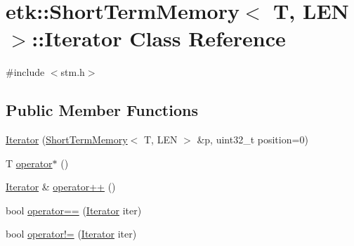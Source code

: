 \hypertarget{classetk_1_1_short_term_memory_1_1_iterator}{\section{etk\-:\-:Short\-Term\-Memory$<$ T, L\-E\-N $>$\-:\-:Iterator Class Reference}
\label{classetk_1_1_short_term_memory_1_1_iterator}
}


{\ttfamily \#include $<$stm.\-h$>$}

\subsection*{Public Member Functions}
\begin{DoxyCompactItemize}
\item 
\hyperlink{classetk_1_1_short_term_memory_1_1_iterator_a9b5864137b9f2d23d1b79fe6254049d0}{Iterator} (\hyperlink{classetk_1_1_short_term_memory}{Short\-Term\-Memory}$<$ T, L\-E\-N $>$ \&p, uint32\-\_\-t position=0)
\item 
T \hyperlink{classetk_1_1_short_term_memory_1_1_iterator_ae0dad866d5927d8ee3d9717a178427e8}{operator$\ast$} ()
\item 
\hyperlink{classetk_1_1_short_term_memory_1_1_iterator}{Iterator} \& \hyperlink{classetk_1_1_short_term_memory_1_1_iterator_ae5d8621f94f142690d5d2bd50aa3d8af}{operator++} ()
\item 
bool \hyperlink{classetk_1_1_short_term_memory_1_1_iterator_a18c7ce8f9a1b98ffec26f6be66fa54b0}{operator==} (\hyperlink{classetk_1_1_short_term_memory_1_1_iterator}{Iterator} iter)
\item 
bool \hyperlink{classetk_1_1_short_term_memory_1_1_iterator_aee6649ed22232dae992b18a2386a8893}{operator!=} (\hyperlink{classetk_1_1_short_term_memory_1_1_iterator}{Iterator} iter)
\end{DoxyCompactItemize}


